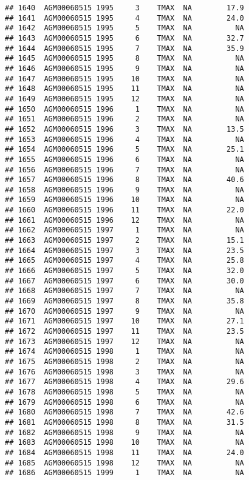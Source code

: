 \documentclass{article}\usepackage[]{graphicx}\usepackage[]{color}
\makeatletter
\newenvironment{kframe}{%
 \def\at@end@of@kframe{}%
 \ifinner\ifhmode%
  \def\at@end@of@kframe{\end{minipage}}%
  \begin{minipage}{\columnwidth}%
 \fi\fi%
 \def\FrameCommand##1{\hskip\@totalleftmargin \hskip-\fboxsep
 \colorbox{shadecolor}{##1}\hskip-\fboxsep
     \hskip-\linewidth \hskip-\@totalleftmargin \hskip\columnwidth}%
 \MakeFramed {\advance\hsize-\width
   \@totalleftmargin\z@ \linewidth\hsize
   \@setminipage}}%
 {\par\unskip\endMakeFramed%
 \at@end@of@kframe}
\newenvironment{knitrout}{}{} %
\makeatother
\begin{document}
\begin{knitrout}
\begin{kframe}
\begin{verbatim}
## 1640  AGM00060515 1995     3    TMAX  NA        17.9
## 1641  AGM00060515 1995     4    TMAX  NA        24.0
## 1642  AGM00060515 1995     5    TMAX  NA          NA
## 1643  AGM00060515 1995     6    TMAX  NA        32.7
## 1644  AGM00060515 1995     7    TMAX  NA        35.9
## 1645  AGM00060515 1995     8    TMAX  NA          NA
## 1646  AGM00060515 1995     9    TMAX  NA          NA
## 1647  AGM00060515 1995    10    TMAX  NA          NA
## 1648  AGM00060515 1995    11    TMAX  NA          NA
## 1649  AGM00060515 1995    12    TMAX  NA          NA
## 1650  AGM00060515 1996     1    TMAX  NA          NA
## 1651  AGM00060515 1996     2    TMAX  NA          NA
## 1652  AGM00060515 1996     3    TMAX  NA        13.5
## 1653  AGM00060515 1996     4    TMAX  NA          NA
## 1654  AGM00060515 1996     5    TMAX  NA        25.1
## 1655  AGM00060515 1996     6    TMAX  NA          NA
## 1656  AGM00060515 1996     7    TMAX  NA          NA
## 1657  AGM00060515 1996     8    TMAX  NA        40.6
## 1658  AGM00060515 1996     9    TMAX  NA          NA
## 1659  AGM00060515 1996    10    TMAX  NA          NA
## 1660  AGM00060515 1996    11    TMAX  NA        22.0
## 1661  AGM00060515 1996    12    TMAX  NA          NA
## 1662  AGM00060515 1997     1    TMAX  NA          NA
## 1663  AGM00060515 1997     2    TMAX  NA        15.1
## 1664  AGM00060515 1997     3    TMAX  NA        23.5
## 1665  AGM00060515 1997     4    TMAX  NA        25.8
## 1666  AGM00060515 1997     5    TMAX  NA        32.0
## 1667  AGM00060515 1997     6    TMAX  NA        30.0
## 1668  AGM00060515 1997     7    TMAX  NA          NA
## 1669  AGM00060515 1997     8    TMAX  NA        35.8
## 1670  AGM00060515 1997     9    TMAX  NA          NA
## 1671  AGM00060515 1997    10    TMAX  NA        27.1
## 1672  AGM00060515 1997    11    TMAX  NA        23.5
## 1673  AGM00060515 1997    12    TMAX  NA          NA
## 1674  AGM00060515 1998     1    TMAX  NA          NA
## 1675  AGM00060515 1998     2    TMAX  NA          NA
## 1676  AGM00060515 1998     3    TMAX  NA          NA
## 1677  AGM00060515 1998     4    TMAX  NA        29.6
## 1678  AGM00060515 1998     5    TMAX  NA          NA
## 1679  AGM00060515 1998     6    TMAX  NA          NA
## 1680  AGM00060515 1998     7    TMAX  NA        42.6
## 1681  AGM00060515 1998     8    TMAX  NA        31.5
## 1682  AGM00060515 1998     9    TMAX  NA          NA
## 1683  AGM00060515 1998    10    TMAX  NA          NA
## 1684  AGM00060515 1998    11    TMAX  NA        24.0
## 1685  AGM00060515 1998    12    TMAX  NA          NA
## 1686  AGM00060515 1999     1    TMAX  NA          NA

\end{verbatim}
\end{kframe}
\end{knitrout}
\end{document}
